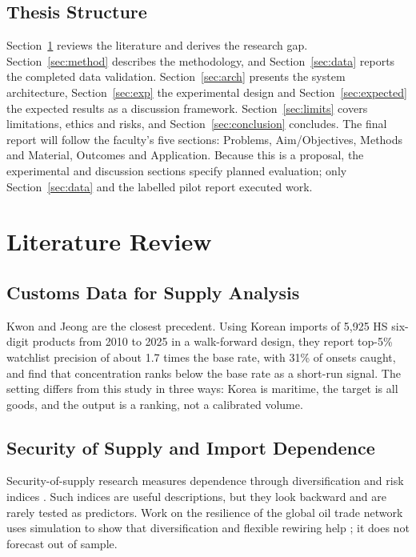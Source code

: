 \documentclass[conference]{IEEEtran}
\begin{document}
\subsection{Thesis Structure}
Section~\ref{sec:lit} reviews the literature and derives the research gap. Section~\ref{sec:method} describes the methodology, and Section~\ref{sec:data} reports the completed data validation. Section~\ref{sec:arch} presents the system architecture, Section~\ref{sec:exp} the experimental design and Section~\ref{sec:expected} the expected results as a discussion framework. Section~\ref{sec:limits} covers limitations, ethics and risks, and Section~\ref{sec:conclusion} concludes. The final report will follow the faculty's five sections: Problems, Aim/Objectives, Methods and Material, Outcomes and Application. Because this is a proposal, the experimental and discussion sections specify planned evaluation; only Section~\ref{sec:data} and the labelled pilot report executed work.

\section{Literature Review}\label{sec:lit}

\subsection{Customs Data for Supply Analysis}
Kwon and Jeong \cite{kwon2026} are the closest precedent. Using Korean imports of 5,925 HS six-digit products from 2010 to 2025 in a walk-forward design, they report top-5\% watchlist precision of about 1.7 times the base rate, with 31\% of onsets caught, and find that concentration ranks below the base rate as a short-run signal. The setting differs from this study in three ways: Korea is maritime, the target is all goods, and the output is a ranking, not a calibrated volume.

\subsection{Security of Supply and Import Dependence}
Security-of-supply research measures dependence through diversification and risk indices \cite{cohen2011,lecoq2009,ang2015}. Such indices are useful descriptions, but they look backward and are rarely tested as predictors. Work on the resilience of the global oil trade network uses simulation to show that diversification and flexible rewiring help \cite{chen2025}; it does not forecast out of sample.
\end{document}
